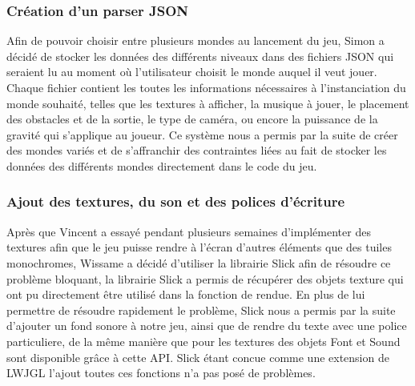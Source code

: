 \subsubsection{Création d'un parser JSON}
Afin de pouvoir choisir entre plusieurs mondes au lancement du jeu, Simon a décidé de stocker les données des différents niveaux dans des fichiers JSON qui seraient lu au moment où l'utilisateur choisit le monde auquel il veut jouer.
\ml
Chaque fichier contient les toutes les informations nécessaires à l'instanciation du monde souhaité, telles que les textures à afficher, la musique à jouer, le placement des obstacles et de la sortie, le type de caméra, ou encore la puissance de la gravité qui s'applique au joueur.
\ml
Ce système nous a permis par la suite de créer des mondes variés et de s'affranchir des contraintes liées au fait de stocker les données des différents mondes directement dans le code du jeu.

\subsubsection{Ajout des textures, du son et des polices d'écriture}

Après que Vincent a essayé pendant plusieurs semaines d'implémenter des textures afin que le jeu puisse rendre à l'écran d'autres éléments que des tuiles monochromes, Wissame a décidé d'utiliser la librairie Slick afin de résoudre ce problème bloquant, la librairie Slick a permis de récupérer des objets texture qui ont pu directement être utilisé dans la fonction de rendue.
\ml
En plus de lui permettre de résoudre rapidement le problème, Slick nous a permis par la suite d'ajouter un fond sonore à notre jeu, ainsi que de rendre du texte avec une police particuliere, de la même manière que pour les textures des objets Font et Sound sont disponible grâce à cette API.
\ml
Slick étant concue comme une extension de LWJGL l'ajout toutes ces fonctions n'a pas posé de problèmes.